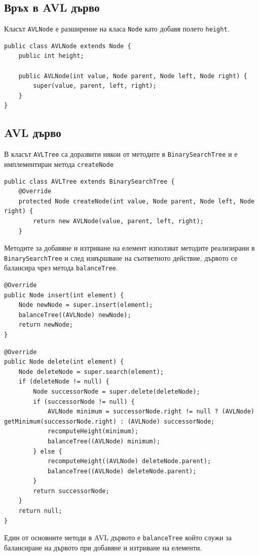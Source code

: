 \documentclass[a4paper,fleqn,12pt]{article}
\begin{document}
\newpage

\subsection{Връх в AVL дърво}
Класът \texttt{AVLNode} е разширение на класа \texttt{Node} като добавя полето \texttt{height}.
\begin{lstlisting}
public class AVLNode extends Node {
    public int height;

    public AVLNode(int value, Node parent, Node left, Node right) {
        super(value, parent, left, right);
    }
}
\end{lstlisting}

\subsection{AVL дърво}
В класът \texttt{AVLTree} са доразвити някои от методите в \texttt{BinarySearchTree} и е имплементиран метода \texttt{createNode} 
\begin{lstlisting}
public class AVLTree extends BinarySearchTree {
    @Override
    protected Node createNode(int value, Node parent, Node left, Node right) {
        return new AVLNode(value, parent, left, right);
    }
\end{lstlisting}
Методите за добавяне и изтриване на елемент използват методите реализирани в \texttt{BinarySearchTree} и след извършване на съответното действие, дървото се балансира чрез метода \texttt{balanceTree}. 
\begin{lstlisting}
@Override
public Node insert(int element) {
    Node newNode = super.insert(element);
    balanceTree((AVLNode) newNode);
    return newNode;
}
\end{lstlisting}
\newpage
\begin{lstlisting}
@Override
public Node delete(int element) {
    Node deleteNode = super.search(element);
    if (deleteNode != null) {
        Node successorNode = super.delete(deleteNode);
        if (successorNode != null) {
            AVLNode minimum = successorNode.right != null ? (AVLNode) getMinimum(successorNode.right) : (AVLNode) successorNode;
            recomputeHeight(minimum);
            balanceTree((AVLNode) minimum);
        } else {
            recomputeHeight((AVLNode) deleteNode.parent);
            balanceTree((AVLNode) deleteNode.parent);
        }
        return successorNode;
    }
    return null;
}
\end{lstlisting}
Един от основните методи в AVL дървото е \texttt{balanceTree} който служи за балансиране на дървото при добавяне и изтриване на елементи. 
\end{document}

